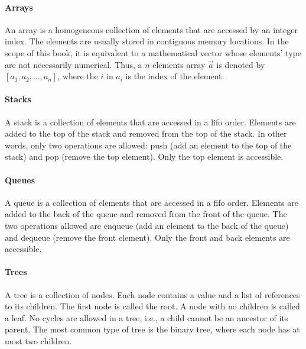 \paragraph{Arrays}  An array is a homogeneous collection of elements that are accessed by
an integer index.  The elements are usually stored in contiguous memory locations.
In the scope of this book, it is equivalent to a mathematical vector whose elements' type
are not necessarily numerical.  Thus, a $n$-elements array $\vec{a}$ is denoted by
$\left[a_1, a_2, \dots, a_n\right]$, where the $i$ in $a_i$ is the index of the element.


\paragraph{Stacks}  A stack is a collection of elements that are accessed in a
\gls{lifo} order.  Elements are added to the top of the stack and
removed from the top of the stack.  In other words, only two operations are
allowed: push (add an element to the top of the stack) and pop (remove the top element).
Only the top element is accessible.

\paragraph{Queues}  A queue is a collection of elements that are accessed in a
\gls{fifo} order.  Elements are added to the back of the queue and
removed from the front of the queue.  The two operations allowed are enqueue (add an
element to the back of the queue) and dequeue (remove the front element).  Only the
front and back elements are accessible.

\paragraph{Trees}  A tree is a collection of nodes.  Each node contains a value and a list
of references to its children.  The first node is called the root.  A node with no
children is called a leaf.  No cycles are allowed in a tree, i.e., a child cannot be an
ancestor of its parent. The most common type of tree is the binary tree, where each node
has at most two children.

